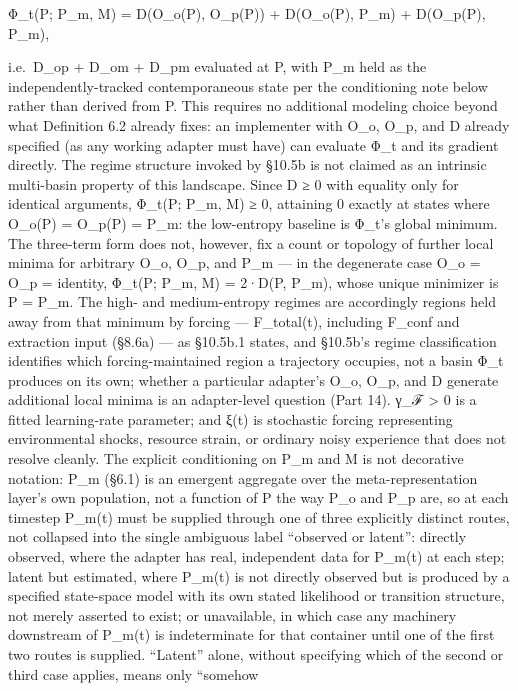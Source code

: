 \documentclass[
]{article}
\begin{document}
Φ\_t(P; P\_m, M) = D(O\_o(P), O\_p(P)) + D(O\_o(P), P\_m) + D(O\_p(P),
P\_m),

i.e.~D\_op + D\_om + D\_pm evaluated at P, with P\_m held as the
independently-tracked contemporaneous state per the conditioning note
below rather than derived from P. This requires no additional modeling
choice beyond what Definition 6.2 already fixes: an implementer with
O\_o, O\_p, and D already specified (as any working adapter must have)
can evaluate Φ\_t and its gradient directly. The regime structure
invoked by §10.5b is not claimed as an intrinsic multi-basin property of
this landscape. Since D ≥ 0 with equality only for identical arguments,
Φ\_t(P; P\_m, M) ≥ 0, attaining 0 exactly at states where O\_o(P) =
O\_p(P) = P\_m: the low-entropy baseline is Φ\_t's global minimum. The
three-term form does not, however, fix a count or topology of further
local minima for arbitrary O\_o, O\_p, and P\_m --- in the degenerate
case O\_o = O\_p = identity, Φ\_t(P; P\_m, M) = 2·D(P, P\_m), whose
unique minimizer is P = P\_m. The high- and medium-entropy regimes are
accordingly regions held away from that minimum by forcing ---
F\_total(t), including F\_conf and extraction input (§8.6a) --- as
§10.5b.1 states, and §10.5b's regime classification identifies which
forcing-maintained region a trajectory occupies, not a basin Φ\_t
produces on its own; whether a particular adapter's O\_o, O\_p, and D
generate additional local minima is an adapter-level question (Part 14).
γ\_ℱ \textgreater{} 0 is a fitted learning-rate parameter; and ξ(t) is
stochastic forcing representing environmental shocks, resource strain,
or ordinary noisy experience that does not resolve cleanly. The explicit
conditioning on P\_m and M is not decorative notation: P\_m (§6.1) is an
emergent aggregate over the meta-representation layer's own population,
not a function of P the way P\_o and P\_p are, so at each timestep
P\_m(t) must be supplied through one of three explicitly distinct
routes, not collapsed into the single ambiguous label ``observed or
latent'': directly observed, where the adapter has real, independent
data for P\_m(t) at each step; latent but estimated, where P\_m(t) is
not directly observed but is produced by a specified state-space model
with its own stated likelihood or transition structure, not merely
asserted to exist; or unavailable, in which case any machinery
downstream of P\_m(t) is indeterminate for that container until one of
the first two routes is supplied. ``Latent'' alone, without specifying
which of the second or third case applies, means only ``somehow
\end{document}

